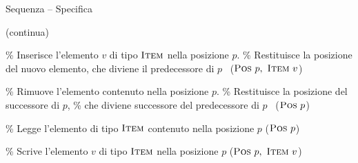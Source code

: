 \begin{frame}[shrink=10]{Sequenza -- Specifica}

\vspace{-12pt}
\begin{Procedure}
\caption[A]{\Sequence (continua)}

\% Inserisce l'elemento $v$ di tipo $\textsc{Item}$ nella posizione $p$.\; 
\% Restituisce la posizione del nuovo elemento, che diviene il predecessore di $p$\;
\alert{\Postype\ \listinsert($\Postype\ p,\ \Item\ v$)\;}

\BlankLine
\% Rimuove l'elemento contenuto nella posizione $p$.\;
\% Restituisce la posizione del successore di $p$, \;
\% che diviene successore del predecessore di $p$\;
\alert{\Postype\ \listRemove($\Postype\ p$)\;}

\BlankLine
\% Legge l'elemento di tipo $\textsc{Item}$ contenuto nella posizione $p$\;
\alert{\Item \listread($\Postype\ p$)\;}

\BlankLine
\% Scrive l'elemento $v$ di tipo $\textsc{Item}$ nella posizione $p$\;
\alert{\listwrite($\Postype\ p,\ \Item\ v$)\;}

\end{Procedure}

\end{frame}

